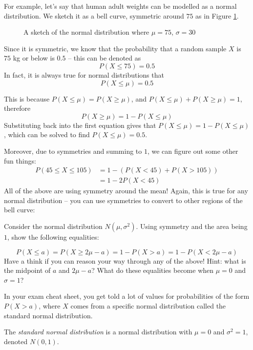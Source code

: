 For example, let's say that human adult weights can be modelled as a normal distribution. 
We sketch it as a bell curve, symmetric around $75$ as in Figure \ref{fig:normal_distribution_weight}.

\begin{figure}[H]
    \centering
    \caption{A sketch of the normal distribution where $\mu=75$, $\sigma=30$}
    \label{fig:normal_distribution_weight}
\end{figure}

Since it is symmetric, we know that the probability that a random sample $X$ is $75$ kg or below is $0.5$ -- this can be denoted as 
\[ P(X\leq75) = 0.5\]
In fact, it is always true for normal distributions that 
\[P(X \leq \mu) = 0.5\]

This is because $P(X\leq\mu) = P(X\geq \mu)$, and $P(X\leq\mu) + P(X\geq \mu) = 1$, therefore \[P(X\geq \mu) = 1 - P(X\leq\mu)\] Substituting back into the first 
equation gives that  $P(X\leq\mu)= 1 - P(X\leq\mu)$, which can be solved to find $P(X\leq\mu)=0.5$.

Moreover, due to symmetries and summing to $1$, we can figure out some other fun things:
\begin{align*}
P(45\leq X \leq 105) &= 1 - (P(X<45) + P(X>105)) \tag{the full area is $1$}\\ 
&= 1 - 2P(X<45) \tag{symmetry around the mean}    
\end{align*}
All of the above are using symmetry around the mean! Again, this is true for any normal distribution -- you can use symmetries to convert 
to other regions of the bell curve:

\begin{exercise}

Consider the normal distribution $N(\mu,\sigma^2)$. Using symmetry and the area being $1$, show the following equalities:

\[P(X\leq a) = P(X\geq 2\mu - a) = 1 - P(X>a) = 1-P(X<2\mu-a)\]
Have a think if you can reason your way through any of the above! Hint: what is the midpoint of $a$ and $2\mu - a$? What do these equalities become when $\mu = 0$ and $\sigma = 1$?

\end{exercise}

In your exam cheat sheet, you get told a lot of values for probabilities of the form $P(X > a)$, where $X$ comes from a specific normal distribution called the 
standard normal distribution.
\begin{definition}
    The \emph{standard normal distribution} is a normal distribution with $\mu=0$ and $\sigma^2 = 1$, denoted $N(0,1)$.
\end{definition}

